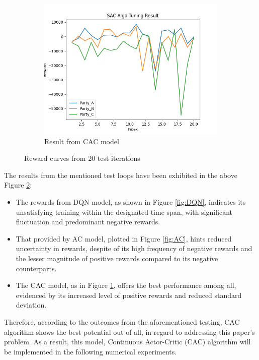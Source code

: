 \documentclass[11pt,twoside]{article}
\numberwithin{Theorem}{section}
\numberwithin{Definition}{section}
\numberwithin{Lemma}{section}
\numberwithin{Algorithm}{section}
\numberwithin{equation}{section}
\begin{document}
\begin{figure}[!ht]
\begin{subfigure}{0.45\textwidth}
    \includegraphics[width=\linewidth]{images/CAC.png}
    \caption{Result from CAC model}
    \label{fig:CAC}
\end{subfigure}
\caption{Reward curves from 20 test iterations}
\label{fig:select}
\end{figure}

The results from the mentioned test loops have been exhibited in the above Figure \ref{fig:select}:
\begin{itemize}
    \item The rewards from DQN model, as shown in Figure \ref{fig:DQN}, indicates its unsatisfying training within the designated time span, with significant fluctuation and predominant negative rewards.
    \item That provided by AC model, plotted in Figure \ref{fig:AC}, hints reduced uncertainty in rewards, despite of its high frequency of negative rewards and the lesser magnitude of positive rewards compared to its negative counterparts.
    \item The CAC model, as in Figure \ref{fig:CAC}, offers the best performance among all, evidenced by its increased level of positive rewards and reduced standard deviation.
\end{itemize}
Therefore, according to the outcomes from the aforementioned testing, CAC algorithm shows the best potential out of all, in regard to addressing this paper's problem. As a result, this model, Continuous Actor-Critic (CAC) algorithm will be implemented in the following numerical experiments.
\end{document}
